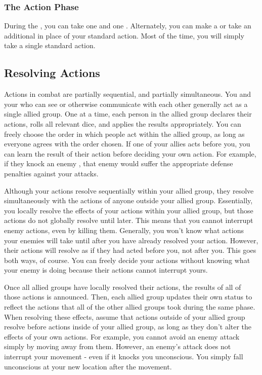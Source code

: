         \subsubsection{The Action Phase}\label{The Action Phase}
            During the , you can take one  and one .
            Alternately, you can make a  or take an additional  in place of your standard action.
            Most of the time, you will simply take a single standard action.

    \subsection{Resolving Actions}\label{Resolving Actions}

        Actions in combat are partially sequential, and partially simultaneous.
        You and your  who can see or otherwise communicate with each other generally act as a single allied group.
        One at a time, each person in the allied group declares their actions, rolls all relevant dice, and applies the results appropriately.
        You can freely choose the order in which people act within the allied group, as long as everyone agrees with the order chosen.
        If one of your allies acts before you, you can learn the result of their action before deciding your own action.
        For example, if they knock an enemy \prone, that enemy would suffer the appropriate defense penalties against your attacks.

        Although your actions resolve sequentially within your allied group, they resolve simultaneously with the actions of anyone outside your allied group.
        Essentially, you locally resolve the effects of your actions within your allied group, but those actions do not globally resolve until later.
        This means that you cannot interrupt enemy actions, even by killing them.
        Generally, you won't know what actions your enemies will take until after you have already resolved your action.
        However, their actions will resolve as if they had acted before you, not after you.
        This goes both ways, of course.
        You can freely decide your actions without knowing what your enemy is doing because their actions cannot interrupt yours.

        Once all allied groups have locally resolved their actions, the results of all of those actions is announced.
        Then, each allied group updates their own status to reflect the actions that all of the other allied groups took during the same phase.
        When resolving these effects, assume that actions outside of your allied group resolve before actions inside of your allied group, as long as they don't alter the effects of your own actions.
        For example, you cannot avoid an enemy attack simply by moving away from them.
        However, an enemy's attack does not interrupt your movement - even if it knocks you unconscious.
        You simply fall unconscious at your new location after the movement.

